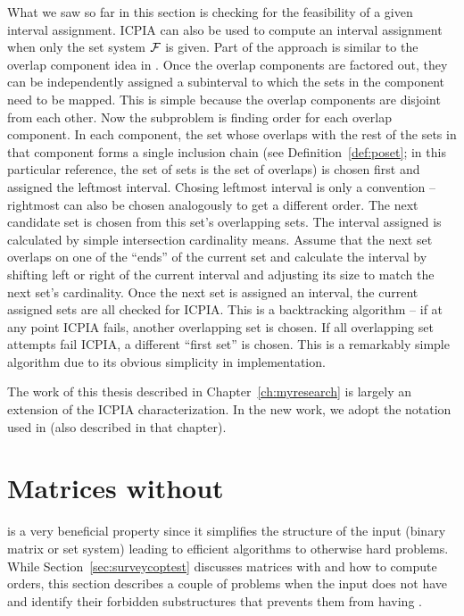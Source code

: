 What we saw so far in this section is checking for the feasibility of
a given interval assignment. ICPIA can also be used to compute an
interval assignment when only the set system ${\cal F}$ is given. Part of
the approach is similar to the overlap component idea in \cite{fg65,
  wlh02}. Once the overlap components are factored out, they can be
independently assigned a subinterval to which the sets in the
component need to be mapped. This is simple because the overlap
components are disjoint from each other. Now the subproblem is finding
\COP order for each overlap component. In each component, the set
whose overlaps with the rest of the sets in that component forms a
single inclusion chain (see Definition~\ref{def:poset}; in this
particular reference, the set of sets is the set of overlaps) is
chosen first and assigned the leftmost interval. Chosing leftmost
interval is only a convention -- rightmost can also be chosen
analogously to get a different \COP order. The next candidate set is
chosen from this set's overlapping sets. The interval assigned is
calculated by simple intersection cardinality means. Assume that the
next set overlaps on one of the ``ends'' of the current set and
calculate the interval by shifting left or right of the current
interval and adjusting its size to match the next set's
cardinality. Once the next set is assigned an interval, the current
assigned sets are all checked for ICPIA. This is a backtracking
algorithm -- if at any point ICPIA fails, another overlapping set is
chosen. If all overlapping set attempts fail ICPIA, a different
``first set'' is chosen. This is a remarkably simple algorithm due to
its obvious simplicity in implementation.

The work of this thesis described in Chapter~\ref{ch:myresearch} is
largely an extension of the ICPIA characterization. In the new work,
we adopt the notation used in \cite{kklv10} (also described in that
chapter).

\section{Matrices without \COP}
\label{sec:surveycopopt}

\COP is a very beneficial property since it simplifies the structure
of the input (binary matrix or set system) leading to
efficient algorithms to otherwise hard problems.  While
Section~\ref{sec:surveycoptest} discusses matrices with \COP and how
to compute \COP orders, this section describes a couple of problems
when the input does not have \COP and identify their forbidden
substructures that prevents them from having \COP.

